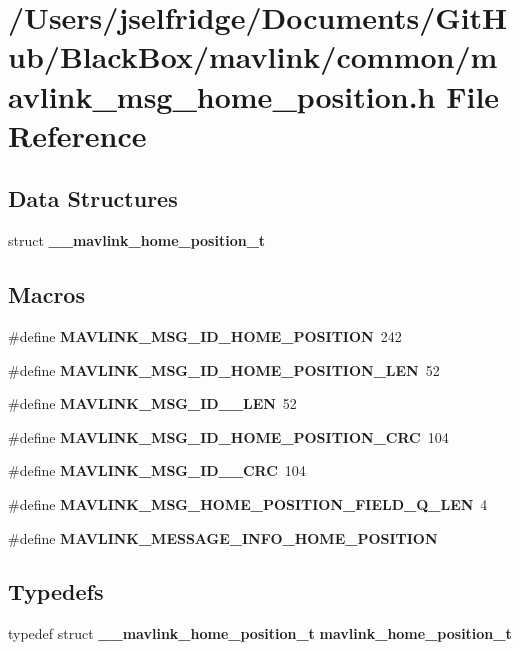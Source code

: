 \section{/\+Users/jselfridge/\+Documents/\+Git\+Hub/\+Black\+Box/mavlink/common/mavlink\+\_\+msg\+\_\+home\+\_\+position.h File Reference}
\label{mavlink__msg__home__position_8h}
\subsection*{Data Structures}
\begin{DoxyCompactItemize}
\item 
struct \textbf{ \+\_\+\+\_\+mavlink\+\_\+home\+\_\+position\+\_\+t}
\end{DoxyCompactItemize}
\subsection*{Macros}
\begin{DoxyCompactItemize}
\item 
\#define \textbf{ M\+A\+V\+L\+I\+N\+K\+\_\+\+M\+S\+G\+\_\+\+I\+D\+\_\+\+H\+O\+M\+E\+\_\+\+P\+O\+S\+I\+T\+I\+ON}~242
\item 
\#define \textbf{ M\+A\+V\+L\+I\+N\+K\+\_\+\+M\+S\+G\+\_\+\+I\+D\+\_\+\+H\+O\+M\+E\+\_\+\+P\+O\+S\+I\+T\+I\+O\+N\+\_\+\+L\+EN}~52
\item 
\#define \textbf{ M\+A\+V\+L\+I\+N\+K\+\_\+\+M\+S\+G\+\_\+\+I\+D\+\_\+\_\+\+L\+EN}~52
\item 
\#define \textbf{ M\+A\+V\+L\+I\+N\+K\+\_\+\+M\+S\+G\+\_\+\+I\+D\+\_\+\+H\+O\+M\+E\+\_\+\+P\+O\+S\+I\+T\+I\+O\+N\+\_\+\+C\+RC}~104
\item 
\#define \textbf{ M\+A\+V\+L\+I\+N\+K\+\_\+\+M\+S\+G\+\_\+\+I\+D\+\_\+\_\+\+C\+RC}~104
\item 
\#define \textbf{ M\+A\+V\+L\+I\+N\+K\+\_\+\+M\+S\+G\+\_\+\+H\+O\+M\+E\+\_\+\+P\+O\+S\+I\+T\+I\+O\+N\+\_\+\+F\+I\+E\+L\+D\+\_\+\+Q\+\_\+\+L\+EN}~4
\item 
\#define \textbf{ M\+A\+V\+L\+I\+N\+K\+\_\+\+M\+E\+S\+S\+A\+G\+E\+\_\+\+I\+N\+F\+O\+\_\+\+H\+O\+M\+E\+\_\+\+P\+O\+S\+I\+T\+I\+ON}
\end{DoxyCompactItemize}
\subsection*{Typedefs}
\begin{DoxyCompactItemize}
\item 
typedef struct \textbf{ \+\_\+\+\_\+mavlink\+\_\+home\+\_\+position\+\_\+t} \textbf{ mavlink\+\_\+home\+\_\+position\+\_\+t}
\end{DoxyCompactItemize}


